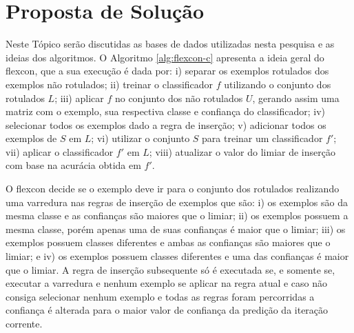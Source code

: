 


\section{Proposta de Solução}
    \label{sec:proposta-de-solucao}
    
    Neste Tópico serão discutidas as bases de dados utilizadas nesta pesquisa e as ideias dos algoritmos. O Algoritmo \ref{alg:flexcon-c} apresenta a ideia geral do \ac{flexcon}, que a sua execução é dada por: i) separar os exemplos rotulados dos exemplos não rotulados; ii) treinar o classificador $f$ utilizando o conjunto dos rotulados $L$; iii) aplicar $f$ no conjunto dos não rotulados $U$, gerando assim uma matriz com o exemplo, sua respectiva classe e confiança do classificador; iv) selecionar todos os exemplos dado a regra de inserção; v) adicionar todos os exemplos de $S$ em $L$; vi) utilizar o conjunto $S$ para treinar um classificador $f'$; vii) aplicar o classificador $f'$ em $L$; viii) atualizar o valor do limiar de inserção com base na acurácia obtida em $f'$.
    
    O \ac{flexcon} decide se o exemplo deve ir para o conjunto dos rotulados realizando uma varredura nas regras de inserção de exemplos que são: i) os exemplos são da mesma classe e as confianças são maiores que o limiar; ii) os exemplos possuem a mesma classe, porém apenas uma de suas confianças é maior que o limiar; iii) os exemplos possuem classes diferentes e ambas as confianças são maiores que o limiar; e iv) os exemplos possuem classes diferentes e uma das confianças é maior que o limiar. A regra de inserção subsequente só é executada se, e somente se, executar a varredura e nenhum exemplo se aplicar na regra atual e caso não consiga selecionar nenhum exemplo e todas as regras foram percorridas a confiança é alterada para o maior valor de confiança da predição da iteração corrente.
    
